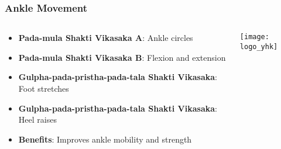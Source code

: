 \begin{frame}[fragile]\frametitle{Ankle Movement}
\begin{columns}
    \begin{column}[T]{0.5\linewidth}
      \begin{itemize}
		\item \textbf{Pada-mula Shakti Vikasaka A}: Ankle circles
		\item \textbf{Pada-mula Shakti Vikasaka B}: Flexion and extension
		\item \textbf{Gulpha-pada-pristha-pada-tala Shakti Vikasaka}: Foot stretches
		\item \textbf{Gulpha-pada-pristha-pada-tala Shakti Vikasaka}: Heel raises
		\item \textbf{Benefits}: Improves ankle mobility and strength
	  \end{itemize}
    \end{column}
    \begin{column}[T]{0.5\linewidth}
		\begin{center}
		\texttt{[image: logo\_yhk]}
		\end{center}	
    \end{column}
\end{columns}
\end{frame}


